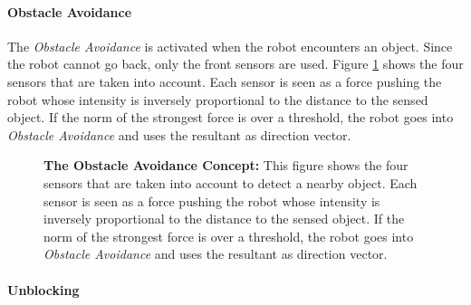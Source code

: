 \documentclass[oneside, a4paper, 12pt]{memoir}
\let\oldCaption\caption
\renewcommand{\caption}[2]{
\oldCaption[#1]{{\small\sffamily\bfseries #1:} #2}
}
\begin{document}
			\paragraph{Obstacle Avoidance}
			
			The \emph{Obstacle Avoidance} is activated when the robot encounters an object. Since the robot cannot go back, only the front sensors are used. Figure \ref{fig:obstacle_avoidance} shows the four sensors that are taken into account. Each sensor is seen as a force pushing the robot whose intensity is inversely proportional to the distance to the sensed object. If the norm of the strongest force is over a threshold, the robot goes into \emph{Obstacle Avoidance} and uses the resultant as direction vector.
			
			\begin{figure}\centering
				
				\caption{The Obstacle Avoidance Concept}{This figure shows the four sensors that are taken into account to detect a nearby object. Each sensor is seen as a force pushing the robot whose intensity is inversely proportional to the distance to the sensed object. If the norm of the strongest force is over a threshold, the robot goes into \emph{Obstacle Avoidance} and uses the resultant as direction vector.}
				\label{fig:obstacle_avoidance}
				\end{figure}
			
			\paragraph{Unblocking}
			
\end{document}
